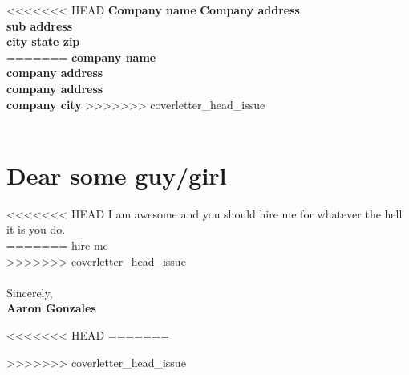 \documentclass[12pt]{friggeri-cv-coverletter} %
\begin{document}

<<<<<<< HEAD
\textbf{Company name}
\textbf{Company address} \\
\textbf{sub address} \\
\textbf{city state zip} \\
=======
\textbf{company name} \\
\textbf{company address} \\
\textbf{company address} \\
\textbf{company city}
>>>>>>> coverletter_head_issue
\\
\\

\section{Dear some guy/girl}

<<<<<<< HEAD
I am awesome and you should hire me for whatever the hell it is you do. 
\\
=======
hire me \\

>>>>>>> coverletter_head_issue
\\
\\
Sincerely, \\
\textbf{Aaron Gonzales}

<<<<<<< HEAD
=======



>>>>>>> coverletter_head_issue
\end{document}
